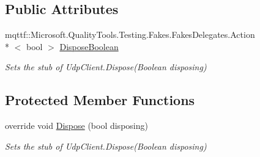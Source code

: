 \subsection*{Public Attributes}
\begin{DoxyCompactItemize}
\item 
mqttf\-::\-Microsoft.\-Quality\-Tools.\-Testing.\-Fakes.\-Fakes\-Delegates.\-Action\\*
$<$ bool $>$ \hyperlink{class_system_1_1_net_1_1_sockets_1_1_fakes_1_1_stub_udp_client_a8e7e37b0d438d2f36dd92a70bc5ec317}{Dispose\-Boolean}
\begin{DoxyCompactList}\small\item\em Sets the stub of Udp\-Client.\-Dispose(\-Boolean disposing)\end{DoxyCompactList}\end{DoxyCompactItemize}
\subsection*{Protected Member Functions}
\begin{DoxyCompactItemize}
\item 
override void \hyperlink{class_system_1_1_net_1_1_sockets_1_1_fakes_1_1_stub_udp_client_acc98161f79a94861def66738e39a15ba}{Dispose} (bool disposing)
\begin{DoxyCompactList}\small\item\em Sets the stub of Udp\-Client.\-Dispose(\-Boolean disposing)\end{DoxyCompactList}\end{DoxyCompactItemize}
